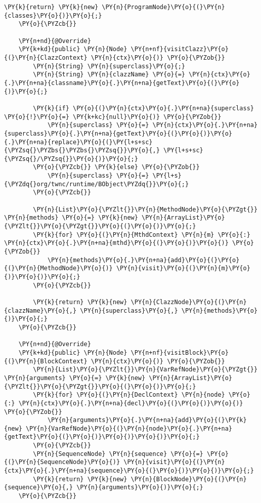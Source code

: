 \begin{Verbatim}[commandchars=\\\{\}]
        \PY{k}{return} \PY{k}{new} \PY{n}{ProgramNode}\PY{o}{(}\PY{n}{classes}\PY{o}{)}\PY{o}{;}
    \PY{o}{\PYZcb{}}

    \PY{n+nd}{@Override}
    \PY{k+kd}{public} \PY{n}{Node} \PY{n+nf}{visitClazz}\PY{o}{(}\PY{n}{ClazzContext} \PY{n}{ctx}\PY{o}{)} \PY{o}{\PYZob{}}
        \PY{n}{String} \PY{n}{superclass}\PY{o}{;}
        \PY{n}{String} \PY{n}{clazzName} \PY{o}{=} \PY{n}{ctx}\PY{o}{.}\PY{n+na}{classname}\PY{o}{.}\PY{n+na}{getText}\PY{o}{(}\PY{o}{)}\PY{o}{;}

        \PY{k}{if} \PY{o}{(}\PY{n}{ctx}\PY{o}{.}\PY{n+na}{superclass} \PY{o}{!}\PY{o}{=} \PY{k+kc}{null}\PY{o}{)} \PY{o}{\PYZob{}}
            \PY{n}{superclass} \PY{o}{=} \PY{n}{ctx}\PY{o}{.}\PY{n+na}{superclass}\PY{o}{.}\PY{n+na}{getText}\PY{o}{(}\PY{o}{)}\PY{o}{.}\PY{n+na}{replace}\PY{o}{(}\PY{l+s+sc}{\PYZsq{}\PYZbs{}\PYZbs{}\PYZsq{}}\PY{o}{,} \PY{l+s+sc}{\PYZsq{}/\PYZsq{}}\PY{o}{)}\PY{o}{;}
        \PY{o}{\PYZcb{}} \PY{k}{else} \PY{o}{\PYZob{}}
            \PY{n}{superclass} \PY{o}{=} \PY{l+s}{\PYZdq{}org/twnc/runtime/BObject\PYZdq{}}\PY{o}{;}
        \PY{o}{\PYZcb{}}

        \PY{n}{List}\PY{o}{\PYZlt{}}\PY{n}{MethodNode}\PY{o}{\PYZgt{}} \PY{n}{methods} \PY{o}{=} \PY{k}{new} \PY{n}{ArrayList}\PY{o}{\PYZlt{}}\PY{o}{\PYZgt{}}\PY{o}{(}\PY{o}{)}\PY{o}{;}
        \PY{k}{for} \PY{o}{(}\PY{n}{MthdContext} \PY{n}{m} \PY{o}{:} \PY{n}{ctx}\PY{o}{.}\PY{n+na}{mthd}\PY{o}{(}\PY{o}{)}\PY{o}{)} \PY{o}{\PYZob{}}
            \PY{n}{methods}\PY{o}{.}\PY{n+na}{add}\PY{o}{(}\PY{o}{(}\PY{n}{MethodNode}\PY{o}{)} \PY{n}{visit}\PY{o}{(}\PY{n}{m}\PY{o}{)}\PY{o}{)}\PY{o}{;}
        \PY{o}{\PYZcb{}}
        
        \PY{k}{return} \PY{k}{new} \PY{n}{ClazzNode}\PY{o}{(}\PY{n}{clazzName}\PY{o}{,} \PY{n}{superclass}\PY{o}{,} \PY{n}{methods}\PY{o}{)}\PY{o}{;}
    \PY{o}{\PYZcb{}}

    \PY{n+nd}{@Override}
    \PY{k+kd}{public} \PY{n}{Node} \PY{n+nf}{visitBlock}\PY{o}{(}\PY{n}{BlockContext} \PY{n}{ctx}\PY{o}{)} \PY{o}{\PYZob{}}
        \PY{n}{List}\PY{o}{\PYZlt{}}\PY{n}{VarRefNode}\PY{o}{\PYZgt{}} \PY{n}{arguments} \PY{o}{=} \PY{k}{new} \PY{n}{ArrayList}\PY{o}{\PYZlt{}}\PY{o}{\PYZgt{}}\PY{o}{(}\PY{o}{)}\PY{o}{;}
        \PY{k}{for} \PY{o}{(}\PY{n}{DeclContext} \PY{n}{node} \PY{o}{:} \PY{n}{ctx}\PY{o}{.}\PY{n+na}{decl}\PY{o}{(}\PY{o}{)}\PY{o}{)} \PY{o}{\PYZob{}}
            \PY{n}{arguments}\PY{o}{.}\PY{n+na}{add}\PY{o}{(}\PY{k}{new} \PY{n}{VarRefNode}\PY{o}{(}\PY{n}{node}\PY{o}{.}\PY{n+na}{getText}\PY{o}{(}\PY{o}{)}\PY{o}{)}\PY{o}{)}\PY{o}{;}
        \PY{o}{\PYZcb{}}
        \PY{n}{SequenceNode} \PY{n}{sequence} \PY{o}{=} \PY{o}{(}\PY{n}{SequenceNode}\PY{o}{)} \PY{n}{visit}\PY{o}{(}\PY{n}{ctx}\PY{o}{.}\PY{n+na}{sequence}\PY{o}{(}\PY{o}{)}\PY{o}{)}\PY{o}{;}
        \PY{k}{return} \PY{k}{new} \PY{n}{BlockNode}\PY{o}{(}\PY{n}{sequence}\PY{o}{,} \PY{n}{arguments}\PY{o}{)}\PY{o}{;}
    \PY{o}{\PYZcb{}}


\end{Verbatim}
